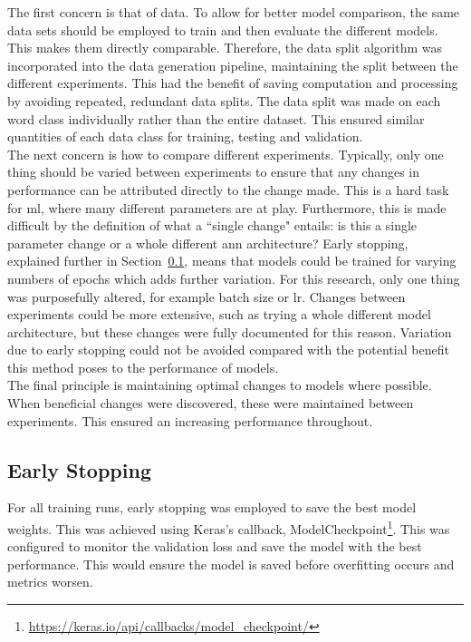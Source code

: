 The first concern is that of data. To allow for better model comparison, the same data sets should be employed to train and then evaluate the different models. This makes them directly comparable. Therefore, the data split algorithm was incorporated into the data generation pipeline, maintaining the split between the different experiments. This had the benefit of saving computation and processing by avoiding repeated, redundant data splits. The data split was made on each word class individually rather than the entire dataset. This ensured similar quantities of each data class for training, testing and validation.\\
The next concern is how to compare different experiments. Typically, only one thing should be varied between experiments to ensure that any changes in performance can be attributed directly to the change made. This is a hard task for \acrshort{ml}, where many different parameters are at play. Furthermore, this is made difficult by the definition of what a ``single change" entails: is this a single parameter change or a whole different \acrshort{ann} architecture? Early stopping, explained further in Section~\ref{sec: Early Stopping}, means that models could be trained for varying numbers of epochs which adds further variation. For this research, only one thing was purposefully altered, for example batch size or \acrfull{lr}. Changes between experiments could be more extensive, such as trying a whole different model architecture, but these changes were fully documented for this reason. Variation due to early stopping could not be avoided compared with the potential benefit this method poses to the performance of models.\\
The final principle is maintaining optimal changes to models where possible. When beneficial changes were discovered, these were maintained between experiments. This ensured an increasing performance throughout.
\subsection{Early Stopping}
\label{sec: Early Stopping}
For all training runs, early stopping was employed to save the best model weights. This was achieved using Keras's callback, ModelCheckpoint\footnote{\url{https://keras.io/api/callbacks/model_checkpoint/}}. This was configured to monitor the validation loss and save the model with the best performance. This would ensure the model is saved before \gls{overfitting} occurs and metrics worsen.

